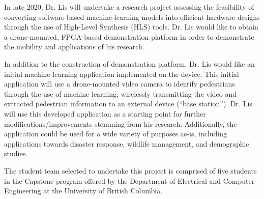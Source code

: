 In late 2020, Dr. Lis will undertake a research project assessing the feasibility of converting software-based machine-learning models into efficient hardware designs through the use of High-Level Synthesis (HLS) tools. Dr. Lis would like to obtain a drone-mounted, FPGA-based demonstration platform in order to demonstrate the mobility and applications of his research. 

In addition to the construction of demonstration platform, Dr. Lis would like an initial machine-learning application implemented on the device. This initial application will use a drone-mounted video camera to identify pedestrians through the use of machine learning, wirelessly transmitting the video and extracted pedestrian information to an external device (``base station''). Dr. Lis will use this developed application as a starting point for further modifications/improvements stemming from his research. Additionally, the application could be used for a wide variety of purposes as-is, including applications towards disaster response, wildlife management, and demographic studies.

The student team selected to undertake this project is comprised of five students in the Capstone program offered by the Department of Electrical and Computer Engineering at the University of British Columbia.
